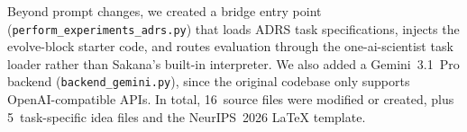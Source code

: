 Beyond prompt changes, we created a bridge entry point (\texttt{perform\_experiments\_adrs.py}) that loads ADRS task specifications, injects the evolve-block starter code, and routes evaluation through the one-ai-scientist task loader rather than Sakana's built-in interpreter.
We also added a Gemini~3.1~Pro backend (\texttt{backend\_gemini.py}), since the original codebase only supports OpenAI-compatible APIs.
In total, 16~source files were modified or created, plus 5~task-specific idea files and the NeurIPS~2026 \LaTeX{} template.

